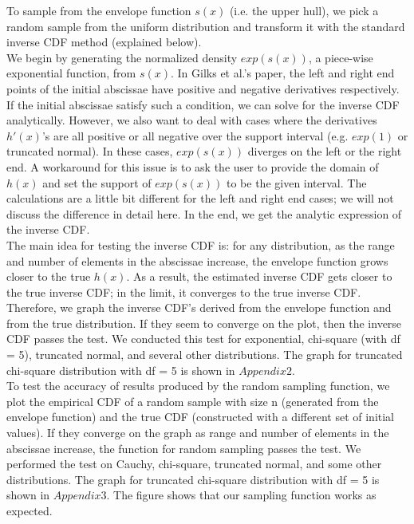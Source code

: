 \documentclass{article}\usepackage[]{graphicx}\usepackage[]{color}
\begin{document}
To sample from the envelope function $s(x)$ (i.e. the upper hull), we pick a random sample from the uniform distribution and transform it with the standard inverse CDF method (explained below).
\\[12pt]
We begin by generating the normalized density $exp(s(x))$, a piece-wise exponential function, from $s(x)$. In Gilks et al.'s paper, the left and right end points of the initial abscissae have positive and negative derivatives respectively. If the initial abscissae satisfy such a condition, we can solve for the inverse CDF analytically. However, we also want to deal with cases where the derivatives $h'(x)$'s are all positive or all negative over the support interval (e.g. $exp(1)$ or truncated normal). In these cases, $exp(s(x))$ diverges on the left or the right end. A workaround for this issue is to ask the user to provide the domain of $h(x)$ and set the support of $exp(s(x))$ to be the given interval. The calculations are a little bit different for the left and right end cases; we will not discuss the difference in detail here. In the end, we get the analytic expression of the inverse CDF.
\\[12pt]
The main idea for testing the inverse CDF is: for any distribution, as the range and number of elements in the abscissae increase, the envelope function grows closer to the true $h(x)$. As a result, the estimated inverse CDF gets closer to the true inverse CDF; in the limit, it converges to the true inverse CDF. Therefore, we graph the inverse CDF's derived from the envelope function and from the true distribution. If they seem to converge on the plot, then the inverse CDF passes the test. We conducted this test for exponential, chi-square (with df = 5), truncated normal, and several other distributions. The graph for truncated chi-square distribution with df = 5 is shown in $Appendix 2$.
\\[12pt]
To test the accuracy of results produced by the random sampling function, we plot the empirical CDF of a random sample with size n (generated from the envelope function) and the true CDF (constructed with a different set of initial values). If they converge on the graph as range and number of elements in the abscissae increase, the function for random sampling passes the test. We performed the test on Cauchy, chi-square, truncated normal, and some other distributions. The graph for truncated chi-square distribution with df = 5 is shown in $Appendix 3$. The figure shows that our sampling function works as expected.
\end{document}

